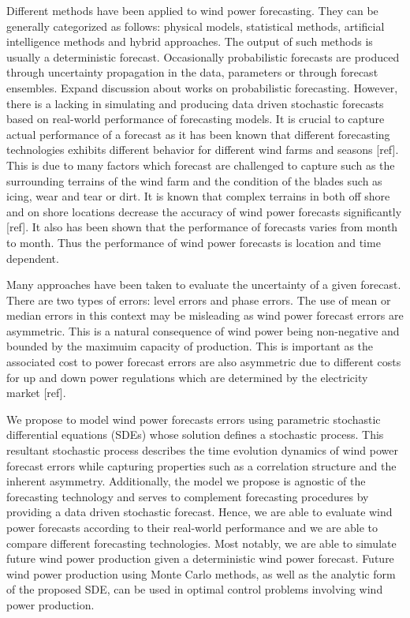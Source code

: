 \documentclass[11pt]{article}
\theoremstyle{definition}
\begin{document}
Different methods have been applied to wind power forecasting. They can be generally categorized as follows: physical models, statistical methods, artificial intelligence methods and hybrid approaches. The output of such methods is usually a deterministic forecast. Occasionally probabilistic forecasts are produced through uncertainty propagation in the data, parameters or through forecast ensembles. {\color{red} Expand discussion about works on probabilistic forecasting.} However, there is a lacking in simulating and producing data driven stochastic forecasts based on real-world performance of forecasting models. It is crucial to capture actual performance of a forecast as it has been known that different forecasting technologies exhibits different behavior for different wind farms and seasons [ref]. This is due to many factors which forecast are challenged to capture such as the surrounding terrains of the wind farm and the condition of the blades such as icing, wear and tear or dirt. It is known that complex terrains in both off shore and on shore locations decrease the accuracy of wind power forecasts significantly [ref]. It also has been shown that the performance of forecasts varies from month to month. Thus the performance of wind power forecasts is location and time dependent.

Many approaches have been taken to evaluate the uncertainty of a given forecast. There are two types of errors: level errors and phase errors. The use of mean or median errors in this context may be misleading as wind power forecast errors are asymmetric. This is a natural consequence of wind power being non-negative and bounded by the maximuim capacity of production. This is important as the associated cost to power forecast errors are also asymmetric due to different costs for up and down  power regulations which are determined by the electricity market [ref].

We propose to model wind power forecasts errors using parametric stochastic differential equations (SDEs) whose solution defines a stochastic process. This resultant stochastic process describes the time evolution dynamics of wind power forecast errors while capturing properties such as a correlation structure and the inherent asymmetry. Additionally, the model we propose is agnostic of the forecasting technology and serves to complement forecasting procedures by providing a data driven stochastic forecast. Hence, we are able to evaluate wind power forecasts according to their real-world performance and we are able to compare different forecasting technologies. Most notably, we are able to simulate future wind power production given a deterministic wind power forecast. Future wind power production using Monte Carlo methods, as well as the analytic form of the proposed SDE, can be used in optimal control problems involving wind power production.
\end{document}
